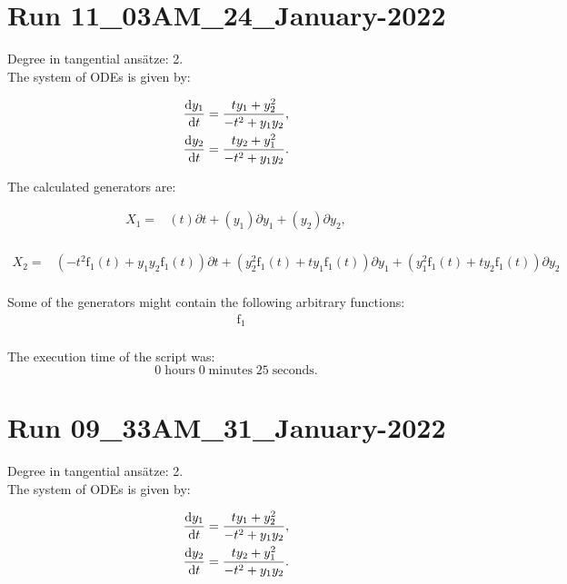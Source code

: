 \section*{Run 11\_03AM\_24\_January-2022}
Degree in tangential ansätze:	2.\\
The system of ODEs is given by:

\begin{align*}
\dv{y_{1}}{t}&=\frac{t y_{1} + y_{2}^{2}}{- t^{2} + y_{1} y_{2}},\\
\dv{y_{2}}{t}&=\frac{t y_{2} + y_{1}^{2}}{- t^{2} + y_{1} y_{2}}.\\
\end{align*}

\noindent The calculated generators are:

\begin{align*}
X_{1}=&\left(t \right)\partial t+\left(y_{1} \right)\partial y_{1}+\left(y_{2} \right)\partial y_{2},\\
\end{align*}

\begin{align*}
X_{2}=&\left(- t^{2} \operatorname{f_{1}}{\left(t \right)}+y_{1} y_{2} \operatorname{f_{1}}{\left(t \right)} \right)\partial t+\left(y_{2}^{2} \operatorname{f_{1}}{\left(t \right)}+t y_{1} \operatorname{f_{1}}{\left(t \right)} \right)\partial y_{1}+\left(y_{1}^{2} \operatorname{f_{1}}{\left(t \right)}+t y_{2} \operatorname{f_{1}}{\left(t \right)} \right)\partial y_{2}\\
\end{align*}



\noindent Some of the generators might contain the following arbitrary functions:
\begin{align*}
&\operatorname{f_{1}}\\
\end{align*}

\noindent The execution time of the script was:
$$0\;\mathrm{hours}\;0\;\mathrm{minutes}\;25 \;\mathrm{seconds}.$$
\section*{Run 09\_33AM\_31\_January-2022}
Degree in tangential ansätze:	2.\\
The system of ODEs is given by:

\begin{align*}
\dv{y_{1}}{t}&=\frac{t y_{1} + y_{2}^{2}}{- t^{2} + y_{1} y_{2}},\\
\dv{y_{2}}{t}&=\frac{t y_{2} + y_{1}^{2}}{- t^{2} + y_{1} y_{2}}.\\
\end{align*}


